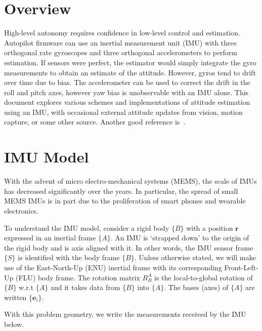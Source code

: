 \documentclass[a4paper]{article}
\begin{document}
\section*{Overview}
High-level autonomy requires confidence in low-level control and estimation.
Autopilot firmware can use an inertial measurement unit (IMU) with three orthogonal rate gyroscopes and three orthogonal accelerometers to perform estimation.
If sensors were perfect, the estimator would simply integrate the gyro measurements to obtain an estimate of the attitude.
However, gyros tend to drift over time due to bias.
The accelerometer can be used to correct the drift in the roll and pitch axes, however yaw bias is unobservable with an IMU alone.
This document explores various schemes and implementations of attitude estimation using an IMU, with occasional external attitude updates from vision, motion capture, or some other source.
Another good reference is~\cite{Kok2017}.

\section*{IMU Model}
With the advent of micro electro-mechanical systems (MEMS), the scale of IMUs has decreased significantly over the years.
In particular, the spread of small MEMS IMUs is in part due to the proliferation of smart phones and wearable electronics.

To understand the IMU model, consider a rigid body $\{B\}$ with a position $\bm{r}$ expressed in an inertial frame $\{A\}$.
An IMU is `strapped down' to the origin of the rigid body and is axis aligned with it.
In other words, the IMU sensor frame $\{S\}$ is identified with the body frame $\{B\}$.
Unless otherwise stated, we will make use of the East-North-Up (ENU) inertial frame with its corresponding Front-Left-Up (FLU) body frame.
The rotation matrix $R^A_B$ is the local-to-global rotation of $\{B\}$ w.r.t $\{A\}$ and it takes data from $\{B\}$ into $\{A\}$.
The bases (axes) of $\{A\}$ are written $\{\bm{e}_i\}$.

With this problem geometry, we write the measurements received by the IMU below.
\end{document}
